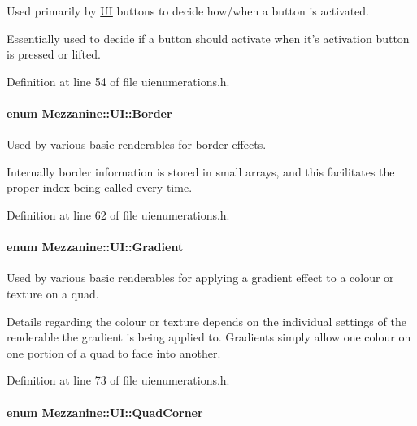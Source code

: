Used primarily by \hyperlink{namespaceMezzanine_1_1UI}{UI} buttons to decide how/when a button is activated. 

Essentially used to decide if a button should activate when it's activation button is pressed or lifted. 

Definition at line 54 of file uienumerations.h.

\hypertarget{namespaceMezzanine_1_1UI_a060de8b459e4991f4a1627166079c406}{
\paragraph[{Border}]{\setlength{\rightskip}{0pt plus 5cm}enum {\bf Mezzanine::UI::Border}}\hfill}
\label{namespaceMezzanine_1_1UI_a060de8b459e4991f4a1627166079c406}


Used by various basic renderables for border effects. 

Internally border information is stored in small arrays, and this facilitates the proper index being called every time. 

Definition at line 62 of file uienumerations.h.

\hypertarget{namespaceMezzanine_1_1UI_a694cd1781f4196f8c391c9147cd41e8e}{
\paragraph[{Gradient}]{\setlength{\rightskip}{0pt plus 5cm}enum {\bf Mezzanine::UI::Gradient}}\hfill}
\label{namespaceMezzanine_1_1UI_a694cd1781f4196f8c391c9147cd41e8e}


Used by various basic renderables for applying a gradient effect to a colour or texture on a quad. 

Details regarding the colour or texture depends on the individual settings of the renderable the gradient is being applied to. Gradients simply allow one colour on one portion of a quad to fade into another. 

Definition at line 73 of file uienumerations.h.

\hypertarget{namespaceMezzanine_1_1UI_a61a42a62e4838bc93b194886a363fe36}{
\paragraph[{QuadCorner}]{\setlength{\rightskip}{0pt plus 5cm}enum {\bf Mezzanine::UI::QuadCorner}}\hfill}
\label{namespaceMezzanine_1_1UI_a61a42a62e4838bc93b194886a363fe36}


